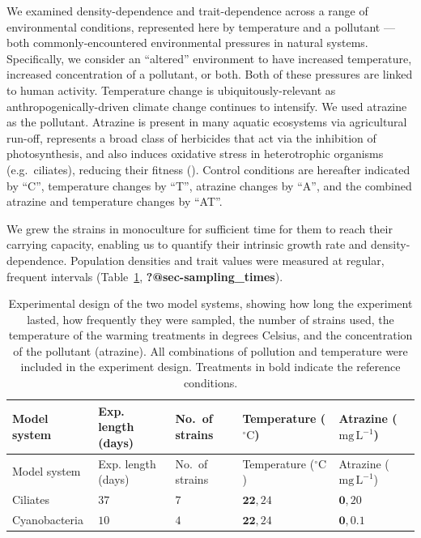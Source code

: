 \documentclass[
  letterpaper,
  DIV=11,
  numbers=noendperiod]{scrartcl}
\begin{document}
We examined density-dependence and trait-dependence across a range of
environmental conditions, represented here by temperature and a
pollutant --- both commonly-encountered environmental pressures in
natural systems. Specifically, we consider an ``altered'' environment to
have increased temperature, increased concentration of a pollutant, or
both. Both of these pressures are linked to human activity. Temperature
change is ubiquitously-relevant as anthropogenically-driven climate
change continues to intensify. We used atrazine as the pollutant.
Atrazine is present in many aquatic ecosystems via agricultural run-off,
represents a broad class of herbicides that act via the inhibition of
photosynthesis, and also induces oxidative stress in heterotrophic
organisms (e.g.~ciliates), reducing their fitness
(). Control conditions are
hereafter indicated by ``C'', temperature changes by ``T'', atrazine
changes by ``A'', and the combined atrazine and temperature changes by
``AT''.

We grew the strains in monoculture for sufficient time for them to reach
their carrying capacity, enabling us to quantify their intrinsic growth
rate and density-dependence. Population densities and trait values were
measured at regular, frequent intervals
(Table~\ref{tbl-treatment_table}, \textbf{?@sec-sampling\_times}).

\label{tbl-treatment_table}
\begin{longtable}[]{@{}lllll@{}}
\caption{\label{tbl-treatment_table}Experimental design of the two model
systems, showing how long the experiment lasted, how frequently they
were sampled, the number of strains used, the temperature of the warming
treatments in degrees Celsius, and the concentration of the pollutant
(atrazine). All combinations of pollution and temperature were included
in the experiment design. Treatments in bold indicate the reference
conditions.}\tabularnewline
\toprule\noalign{}
Model system & Exp. length (days) & No.~of strains & Temperature
(\(\mathrm{^\circ C}\)) & Atrazine (\(\mathrm{mg\,L}^{-1}\)) \\
\midrule\noalign{}
\endfirsthead
\toprule\noalign{}
Model system & Exp. length (days) & No.~of strains & Temperature
(\(\mathrm{^\circ C}\)) & Atrazine (\(\mathrm{mg\,L}^{-1}\)) \\
\midrule\noalign{}
\endhead
\bottomrule\noalign{}
\endlastfoot
Ciliates & \(37\) & \(7\) & \(\mathbf{22}, 24\) & \(\mathbf{0}, 20\) \\
Cyanobacteria & \(10\) & \(4\) & \(\mathbf{22}, 24\) &
\(\mathbf{0}, 0.1\) \\
\end{longtable}
\end{document}
